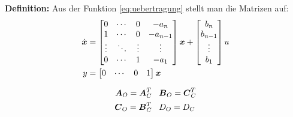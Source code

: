 \textbf{Definition:}
Aus der Funktion \ref{eq:uebertragung} stellt man die Matrizen auf:
	\begin{align*}
		\dot{\boldsymbol{x}} &= 
		\begin{bmatrix}
			0 &  \cdots & 0 &-a_n\\
			1 &\cdots & 0 & -a_{n-1} \\
			\vdots&\ddots&\vdots&\vdots\\
			0&\cdots&1&-a_1
		\end{bmatrix}\boldsymbol{x}+ 
		\begin{bmatrix}
			b_n \\ b_{n-1} \\ \vdots \\b_1
		\end{bmatrix} u \\
		y&= \begin{bmatrix}
			0 & \cdots & 0& 1
		\end{bmatrix} \boldsymbol{x}
	\end{align*}
	\begin{tcolorbox}[colback=white!10!white,colframe=gray!70!black,title=Umrechnungsregeln]
		\begin{align*}
			\boldsymbol{A}_O = \boldsymbol{A}_C^T &\hspace{0.3cm} \boldsymbol{B}_O = \boldsymbol{C}_C^T \\
			\boldsymbol{C}_O = \boldsymbol{B}_C^T   &\hspace{0.3cm} D_O = D_C
		\end{align*}
	
	\end{tcolorbox}